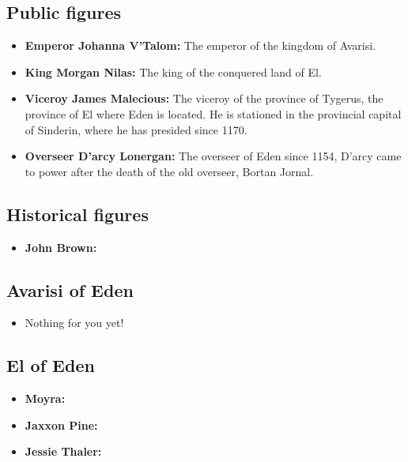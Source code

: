 \documentclass[letterpaper,12pt]{article}
\begin{document}
\subsection{Public figures}

\begin{itemize}
\item \textbf{Emperor Johanna V'Talom:} The emperor of the kingdom of Avarisi.

\item \textbf{King Morgan Nilas:} The king of the conquered land of El.

\item \textbf{Viceroy James Malecious:} The viceroy of the province of Tygerus, the province of El where Eden is located. He is stationed in the provincial capital of Sinderin, where he has presided since 1170.

\item \textbf{Overseer D'arcy Lonergan:} The overseer of Eden since 1154, D'arcy came to power after the death of the old overseer, Bortan Jornal.
\end{itemize}

\subsection{Historical figures}

\begin{itemize}
\item \textbf{John Brown:} 
\end{itemize}

\subsection{Avarisi of Eden}

\begin{itemize}
\item Nothing for you yet!
\end{itemize}

\subsection{El of Eden}

\begin{itemize}
\item \textbf{Moyra:}

\item \textbf{Jaxxon Pine:}

\item \textbf{Jessie Thaler:}

\end{itemize}
\end{document}
